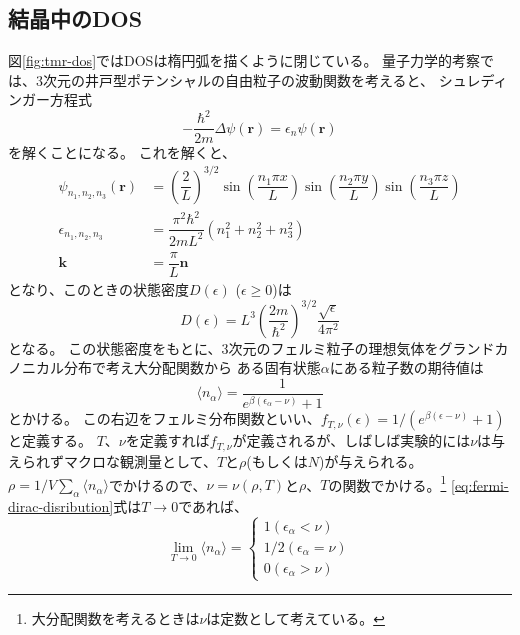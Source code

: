 \documentclass[../../../main]{subfiles}
\begin{document}
\subsection{結晶中のDOS}
図\ref{fig:tmr-dos}ではDOSは楕円弧を描くように閉じている。
量子力学的考察では、3次元の井戸型ポテンシャルの自由粒子の波動関数を考えると、
シュレディンガー方程式
\begin{equation}
	-\dfrac{\hbar^2}{2m}\Delta \psi(\bm{r}) = \epsilon_n \psi(\bm{r})
\end{equation}
を解くことになる。
これを解くと、
\begin{align}
	\psi_{n_1,n_2,n_3} (\bm{r}) & = \left(\dfrac{2}{L}\right)^{3/2} \sin\left(\dfrac{n_1\pi x}{L}\right)   \sin\left(\dfrac{n_2\pi y}{L}\right) \sin\left(\dfrac{n_3\pi z}{L}\right) \\
	\epsilon_{n_1,n_2,n_3}      & = \dfrac{\pi^2 \hbar^2}{2mL^2}\left(n_1^2 + n_2^2 + n_3^2\right)                                                                                   \\
	\bm{k}                      & = \dfrac{\pi}{L} \bm{n} \label{eq:3d-free-particle}
\end{align}
となり、このときの状態密度$D(\epsilon)$ ($\epsilon \geq 0$)は
\begin{equation}
	D(\epsilon) = L^3 \left(\dfrac{2m}{\hbar^2}\right)^{3/2} \dfrac{\sqrt{\epsilon}}{4\pi^2}
\end{equation}
となる。
この状態密度をもとに、3次元のフェルミ粒子の理想気体をグランドカノニカル分布で考え大分配関数から
ある固有状態$\alpha$にある粒子数の期待値は
\begin{equation}\label{eq:fermi-dirac-disribution}
	\langle n_\alpha\rangle = \dfrac{1}{e^{\beta (\epsilon_\alpha - \nu)} + 1}
\end{equation}
とかける。
この右辺をフェルミ分布関数といい、$f_{T,\nu}(\epsilon)= 1/(e^{\beta(\epsilon - \nu)} + 1)$と定義する。
$T$、$\nu$を定義すれば$f_{T,\nu}$が定義されるが、しばしば実験的には$\nu$は与えられずマクロな観測量として、$T$と$\rho$(もしくは$N$)が与えられる。
$\rho = 1/V \sum_{\alpha} \langle n_\alpha \rangle$でかけるので、$\nu = \nu(\rho, T)$と$\rho$、$T$の関数でかける。\footnote{
	大分配関数を考えるときは$\nu$は定数として考えている。
}
\ref{eq:fermi-dirac-disribution}式は$T\rightarrow0$であれば、
\begin{equation}
	\lim_{T\rightarrow0} \langle n_\alpha \rangle =  \left\{
	\begin{alignedat}{3}
		1 (\epsilon_\alpha < \nu)   \\
		1/2 (\epsilon_\alpha = \nu) \\
		0 (\epsilon_\alpha > \nu)
	\end{alignedat}
	\right.
\end{equation}
\end{document}
